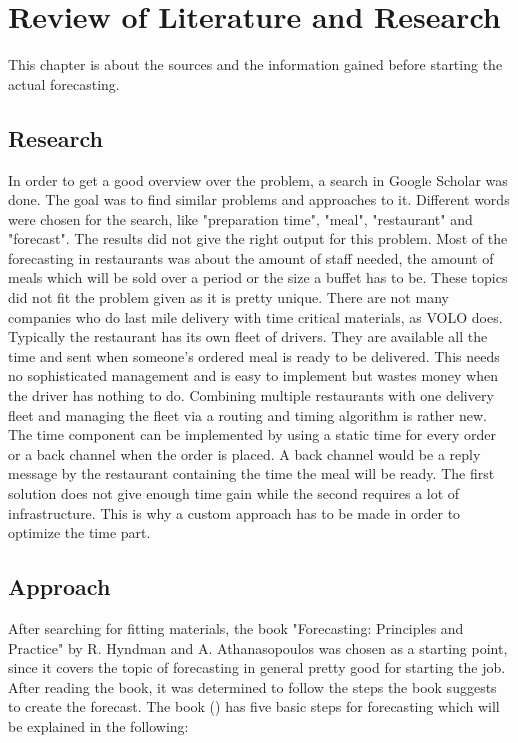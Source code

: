 \renewcommand{\thepage}{\arabic{page}}
\chapter{Review of Literature and Research}\label{chapter:Review of Literature and Research}
This chapter is about the sources and the information gained before starting the actual forecasting.
\section{Research}\label{section:Research}
In order to get a good overview over the problem, a search in Google Scholar was done. The goal was to find similar problems and approaches to it. Different words were chosen for the search, like "preparation time", "meal", "restaurant" and "forecast". The results did not give the right output for this problem. Most of the forecasting in restaurants was about the amount of staff needed, the amount of meals which will be sold over a period or the size a buffet has to
be. These topics did not fit the problem given as it is pretty unique. There are not many companies who do last mile delivery with time critical materials, as VOLO does. Typically the restaurant has its own fleet of drivers. They are available all the time and sent when someone's ordered meal is ready to be delivered. This needs no sophisticated management  and is easy to implement but wastes money when the driver has nothing to do. Combining multiple restaurants with one delivery fleet and managing the fleet via a routing and timing algorithm is rather new. The time component can be implemented by using a static time for every order or a back channel when the order is placed. A back channel would be a reply message by the restaurant containing the time the meal will be ready. The first solution does not give enough time gain while the second requires a lot of infrastructure. This is why a custom approach has to be made in order to optimize the time part.
\section{Approach}\label{section:Approach and Basics}
After searching for fitting materials, the book "Forecasting: Principles and Practice" by R. Hyndman and A. Athanasopoulos was chosen as a starting point, since it covers the topic of forecasting in general pretty good for starting the job. After reading the book, it was determined to follow the steps the book suggests to create the forecast. The book (\cite{Hyndman.2013}) has five basic steps for forecasting which will be explained in the following:

